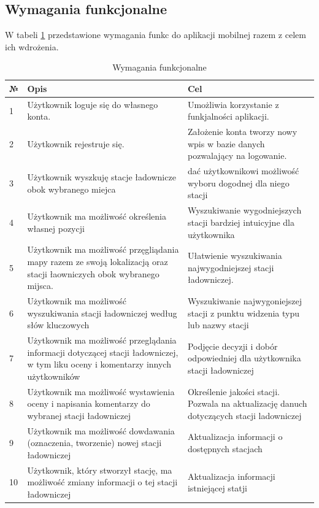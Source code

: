 \subsection{Wymagania funkcjonalne}
W tabeli \ref{tab:wymaganiafunkcjonalne} przedstawione wymagania funkc do aplikacji mobilnej razem z celem ich wdrożenia.
\begin{table}[htb] \small
    \caption{Wymagania funkcjonalne}
    \label{tab:wymaganiafunkcjonalne}
    \begin{tabular}{| m{0.5cm} | m{7cm} | m{7cm} |} 
    \hline
    № & Opis & Cel \\
    \hline
    1 & Użytkownik loguje się do własnego konta. & Umożliwia korzystanie z funkjalności aplikacji. \\ 
    \hline
    2 & Użytkownik rejestruje się. & Założenie konta tworzy nowy wpis w bazie danych pozwalający na logowanie. \\ 
    \hline
    3 & Użytkownik wyszkuję stacje ładownicze obok wybranego miejca  & dać użytkownikowi możliwość wyboru dogodnej dla niego stacji \\
    \hline
    4 & Użytkownik ma możliwość określenia własnej pozycji & Wyszukiwanie wygodniejszych stacji bardziej intuicyjne dla użytkownika  \\
    \hline
    5 & Użytkownik ma możliwość przęgliądania mapy razem ze swoją lokalizacją oraz stacji łaowniczych obok wybranego mijsca. & Ułatwienie wyszukiwania najwygodniejszej stacji ładowniczej. \\
    \hline
    6 & Użytkownik ma możliwość wyszukiwania stacji ładowniczej według słów kluczowych & Wyszukiwanie najwygoniejszej stacji z punktu widzenia typu lub nazwy stacji \\
    \hline
    7 & Użytkownik ma możliwość przeglądania informacji dotyczącej stacji ładowniczej, w tym liku oceny i komentarzy innych użytkowników & Podjęcie decyzji i dobór odpowiedniej dla użytkownika stacji ładowniczej \\
    \hline
    8 & Użytkownik ma możliwość wystawienia oceny i napisania komentarzy do wybranej stacji ładowniczej & Określenie jakości stacji. Pozwala na aktualizację danuch dotyczących stacji ladowniczej \\
    \hline
    9 & Użytkownik ma możliwość dowdawania (oznaczenia, tworzenie) nowej stacji ładowniczej & Aktualizacja informacji o dostępnych stacjach \\
    \hline
    10 & Użytkownik, który stworzył stację, ma możliwość zmiany informacji o tej stacji ładowniczej & Aktualizacja informacji istniejącej statji \\
    \hline
\end{tabular}
\end{table}

